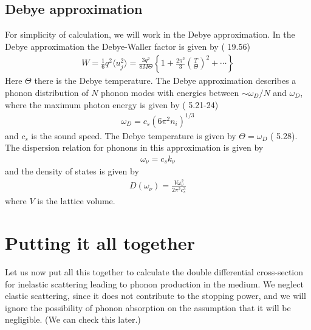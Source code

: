 \documentclass{article}
\begin{document}
\subsection{Debye approximation}

For simplicity of calculation, we will work in the Debye approximation. In the Debye approximation the Debye-Waller factor is given by (\cite{quantum} 19.56)
\begin{align}
W = \frac16 q^2 \langle u_j^2 \rangle = \frac{3 q^2}{8 M \Theta}\left\{ 1 + \frac{2 \pi^2}{3}\left( \frac{T}{\Theta} \right)^2 + \cdots \right\}
\end{align}
Here $\Theta$ there is the Debye temperature. The Debye approximation describes a phonon distribution of $N$ phonon modes with energies between $ \sim \omega_D / N$ and $\omega_D$, where the maximum photon energy is given by (\cite{intro} 5.21-24)
\begin{align}
\omega_D = c_s(6 \pi^2 n_i)^{1/3}
\label{eq:DebyeEnergy}
\end{align}
and $c_s$ is the sound speed. The Debye temperature is given by $\Theta = \omega_D$ (\cite{intro} 5.28). The dispersion relation for phonons in this approximation is given by
\begin{align}
\omega_\nu = c_sk_\nu
\end{align}
and the density of states is given by
\begin{align}
D(\omega_\nu) = \frac{V\omega_\nu^2}{2 \pi^2 c_s^3}
\end{align}
where $V$ is the lattice volume.

\section{Putting it all together}

Let us now put all this together to calculate the double differential cross-section for inelastic scattering leading to phonon production in the medium. We neglect elastic scattering, since it does not contribute to the stopping power, and we will ignore the possibility of phonon absorption on the assumption that it will be negligible. (We can check this later.)
\end{document}
